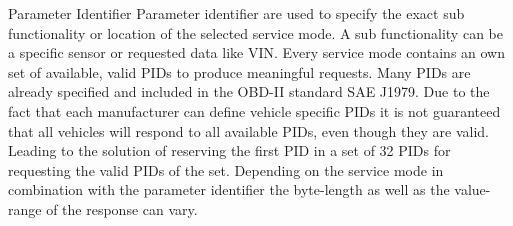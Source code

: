 Parameter Identifier
Parameter identifier are used to specify the exact sub functionality or location of the selected service mode. A sub functionality can be a specific sensor or requested data like VIN. Every service mode contains an own set of available, valid PIDs to produce meaningful requests. Many PIDs are already specified and included in the OBD-II standard SAE J1979. Due to the fact that each manufacturer can define vehicle specific PIDs it is not guaranteed that all vehicles will respond to all available PIDs, even though they are valid. Leading to the solution of reserving the first PID in a set of 32 PIDs for requesting the valid PIDs of the set. Depending on the service mode in combination with the parameter identifier the byte-length as well as the value-range of the response can vary. 


